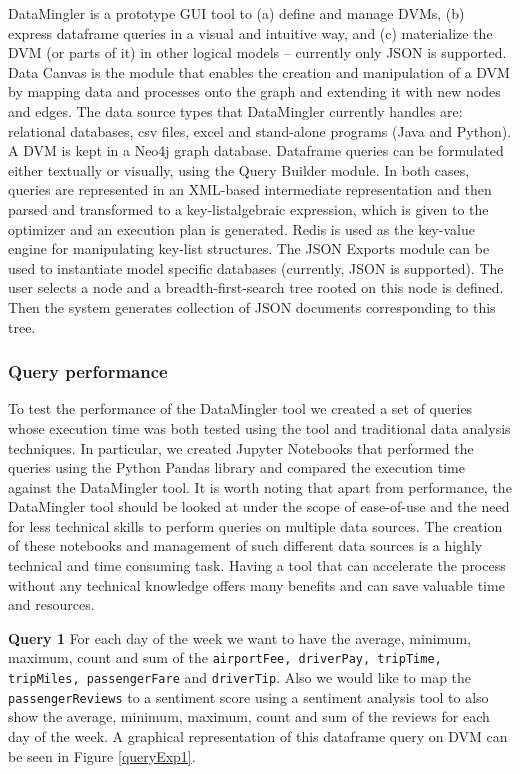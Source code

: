 DataMingler is a prototype GUI tool to (a) define and manage DVMs, (b) express dataframe queries in a visual and intuitive way, and (c) materialize the DVM (or parts of it) in other logical models – currently only JSON is supported. Data Canvas is the module that enables the creation and manipulation of a DVM by mapping data and processes onto the graph and extending it with new nodes and edges. The data source types that DataMingler currently handles are: relational databases, csv files, excel and stand-alone programs (Java and Python). A DVM is kept in a Neo4j graph database. Dataframe queries can be formulated either textually or visually, using the Query Builder module. In both cases, queries are represented in an XML-based intermediate representation and then parsed and transformed to a key-listalgebraic expression, which is given to the optimizer and an execution plan is generated. Redis is used as the key-value engine for manipulating key-list structures. The JSON Exports module can be used to instantiate model specific databases (currently, JSON is supported). The user selects a node and a breadth-first-search tree rooted on this node is defined. Then the system generates collection of JSON documents corresponding to this tree\cite{chatziantoniou}.

\subsubsection{Query performance}

To test the performance of the DataMingler tool we created a set of queries whose execution time was both tested using the tool and traditional data analysis techniques. In particular, we created Jupyter Notebooks that performed the queries using the Python Pandas library and compared the execution time against the DataMingler tool. It is worth noting that apart from performance, the DataMingler tool should be looked at under the scope of ease-of-use and the need for less technical skills to perform queries on multiple data sources. The creation of these notebooks and management of such different data sources is a highly technical and time consuming task. Having a tool that can accelerate the process without any technical knowledge offers many benefits and can save valuable time and resources.

\textbf{Query 1} For each day of the week we want to have the average, minimum, maximum, count and sum of the \texttt{airportFee, driverPay, tripTime, tripMiles, passengerFare} and \texttt{driverTip}. Also we would like to map the \texttt{passengerReviews} to a sentiment score using a sentiment analysis tool to also show the average, minimum, maximum, count and sum of the reviews for each day of the week. A graphical representation of this dataframe query on DVM can be seen in Figure \ref{queryExp1}.

